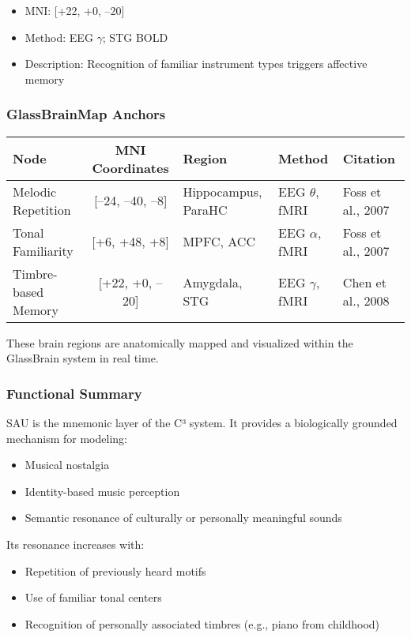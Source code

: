 \begin{itemize}
    \item MNI: [+22, +0, –20]
    \item Method: EEG $\gamma$; STG BOLD
    \item Description: Recognition of familiar instrument types triggers affective memory
\end{itemize}

\subsubsection*{GlassBrainMap Anchors}

\begin{center}
\begin{tabular}{|l|c|l|l|l|}
\hline
\textbf{Node} & \textbf{MNI Coordinates} & \textbf{Region} & \textbf{Method} & \textbf{Citation} \\
\hline
Melodic Repetition & [–24, –40, –8] & Hippocampus, ParaHC & EEG $\theta$, fMRI & Foss et al., 2007 \\
Tonal Familiarity & [+6, +48, +8] & MPFC, ACC & EEG $\alpha$, fMRI & Foss et al., 2007 \\
Timbre-based Memory & [+22, +0, –20] & Amygdala, STG & EEG $\gamma$, fMRI & Chen et al., 2008 \\
\hline
\end{tabular}
\end{center}

These brain regions are anatomically mapped and visualized within the GlassBrain system in real time.

\subsubsection*{Functional Summary}

SAU is the mnemonic layer of the C³ system. It provides a biologically grounded mechanism for modeling:

\begin{itemize}
    \item Musical nostalgia
    \item Identity-based music perception
    \item Semantic resonance of culturally or personally meaningful sounds
\end{itemize}

Its resonance increases with:

\begin{itemize}
    \item Repetition of previously heard motifs
    \item Use of familiar tonal centers
    \item Recognition of personally associated timbres (e.g., piano from childhood)
\end{itemize}

